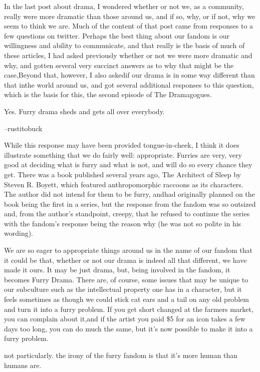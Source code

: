 In the last post about drama, I wondered whether or not we, as a community, really were more dramatic than those around us, and if so, why, or if not, why we seem to think we are. Much of the content of that post came from responses to a few questions on twitter. Perhaps the best thing about our fandom is our willingness and ability to communicate, and that really is the basis of much of these articles, I had asked previously whether or not we were more dramatic and why, and gotten several very succinct answers as to why that might be the case,Beyond that, however, I also askedif our drama is in some way different than that inthe world around us, and got several additional responses to this question, which is the basis for this, the second episode of The Dramagogues.

Yes. Furry drama sheds and gets all over everybody.

--rustitobuck

While this response may have been provided tongue-in-cheek, I think it does illustrate something that we do fairly well: appropriate. Furries are very, very good at deciding what is furry and what is not, and will do so every chance they get. There was a book published several years ago, The Architect of Sleep by Steven R. Boyett, which featured anthropomorphic raccoons as its characters. The author did not intend for them to be furry, andhad originally planned on the book being the first in a series, but the response from the fandom was so outsized and, from the author's standpoint, creepy, that he refused to continue the series with the fandom's response being the reason why (he was not so polite in his wording).

We are so eager to appropriate things around us in the name of our fandom that it could be that, whether or not our drama is indeed all that different, we have made it ours. It may be just drama, but, being involved in the fandom, it becomes Furry Drama. There are, of course, some issues that may be unique to our subculture such as the intellectual property one has in a character, but it feels sometimes as though we could stick cat ears and a tail on any old problem and turn it into a furry problem. If you get short changed at the farmers market, you can complain about it,and if the artist you paid \$5 for an icon takes a few days too long, you can do much the same, but it's now possible to make it into a furry problem.

not particularly. the irony of the furry fandom is that it's more human than humans are.

